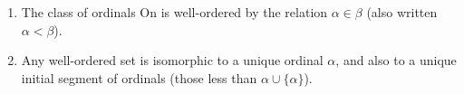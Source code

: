 \begin{enumerate}
\item[(a)] The class of ordinals $\mathrm{On}$ is well-ordered by the relation $\alpha \in \beta$ (also written $\alpha < \beta$).
\item[(b)] Any well-ordered set is isomorphic to a unique ordinal $\alpha$, and also to a unique initial segment of ordinals (those less than $\alpha \cup \{\alpha\}$).
\end{enumerate}
